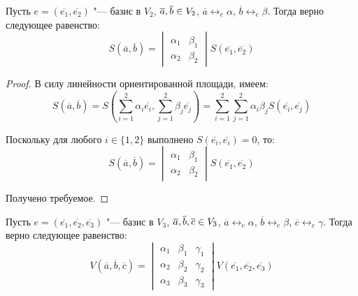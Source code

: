     \begin{theorem}
    	Пусть $e = (\overline{e_1}, \overline{e_2})$ "--- базис в $V_2$, $\overline{a}, \overline{b} \hm{\in} V_2$, $\overline{a} \leftrightarrow_{e} \alpha$, $\overline{b} \leftrightarrow_{e} \beta$. Тогда верно следующее равенство:
    	\[S(\overline{a}, \overline{b}) = \begin{vmatrix}
    	\alpha_1 & \beta_1\\
    	\alpha_2 & \beta_2
    	\end{vmatrix}S(\overline{e_1}, \overline{e_2})\]
    \end{theorem}
    
    \begin{proof}
    	В силу линейности ориентированной площади, имеем:
    	\[S(\overline{a}, \overline{b}) = S\left(\sum_{i = 1}^{2} \alpha_i\overline{e_i}, \sum_{j = 1}^{2} \beta_j\overline{e_j}\right) = \sum_{i = 1}^{2} \sum_{j = 1}^{2}\alpha_i\beta_jS(\overline{e_i}, \overline{e_j})\]
    	
    	Поскольку для любого $i \in \{1, 2\}$ выполнено $S(\overline{e_i}, \overline{e_i}) = 0$, то:
    	\[S(\overline{a}, \overline{b}) = \begin{vmatrix}
    	\alpha_1 & \beta_1\\
    	\alpha_2 & \beta_2
    	\end{vmatrix}S(\overline{e_1}, \overline{e_2})\]
    	
    	Получено требуемое.
    \end{proof}
    
    \begin{theorem}
    	Пусть $e = (\overline{e_1}, \overline{e_2}, \overline{e_3})$ "--- базис в $V_3$, $\overline{a}, \overline{b}, \overline{c} \hm{\in} V_3$, $\overline{a} \leftrightarrow_{e} \alpha$, $\overline{b} \leftrightarrow_{e} \beta$, $\overline{c} \leftrightarrow_{e} \gamma$. Тогда верно следующее равенство:
    	\[V(\overline{a}, \overline{b}, \overline{c}) = \begin{vmatrix}
    	\alpha_1 & \beta_1 & \gamma_1\\
    	\alpha_2 & \beta_2 & \gamma_2\\
    	\alpha_3 & \beta_3 & \gamma_3
    	\end{vmatrix}V(\overline{e_1}, \overline{e_2}, \overline{e_3})\]
    \end{theorem}
    
